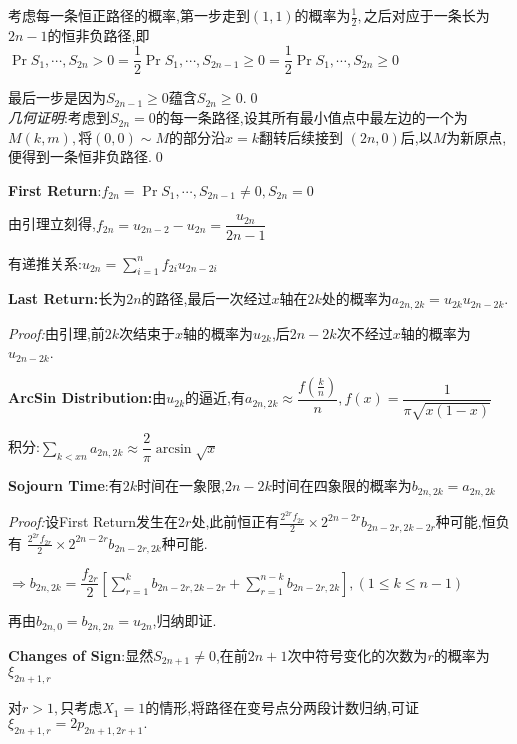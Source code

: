 考虑每一条恒正路径的概率,第一步走到$ (1,1)$的概率为$ \frac{1}{2},$之后对应于一条长为$ 2n-1$的恒非负路径,即
$ \Pr{S_1,\cdots ,S_{2n}>0}=\dfrac{1}{2}\Pr{S_1,\cdots ,S_{2n-1}\ge 0} = \dfrac{1}{2}\Pr{S_1,\cdots ,S_{2n}\ge 0}$

最后一步是因为$ S_{2n-1}\ge 0$蕴含$ S_{2n}\ge 0. $\qed
\\

\textit{几何证明}:考虑到$ S_{2n}=0$的每一条路径,设其所有最小值点中最左边的一个为$ M(k,m),$将$ (0,0)\sim M$的部分沿$ x=k$翻转后续接到
$ (2n,0)$后,以$ M$为新原点,便得到一条恒非负路径.\qed
\vspace{0.6cm}

  \textbf{First Return}:$ f_{2n} = \Pr{S_1,\cdots ,S_{2n-1}\neq 0, S_{2n} = 0}$

  由引理立刻得,$ f_{2n} = u_{2n-2}-u_{2n} = \dfrac{u_{2n}}{2n-1}$

  有递推关系:$ u_{2n}=\sum_{i=1}^n{f_{2i}u_{2n-2i}}$
  \vspace{0.6cm}

  \textbf{Last Return:}长为$ 2n$的路径,最后一次经过$ x$轴在$ 2k$处的概率为$ a_{2n,2k} = u_{2k}u_{2n-2k}$.

  \textit{Proof:}由引理,前$ 2k$次结束于$ x$轴的概率为$ u_{2k}$,后$ 2n-2k$次不经过$ x$轴的概率为$ u_{2n-2k}$.

  \textbf{ArcSin Distribution:}由$ u_{2k}$的逼近,有$ a_{2n,2k}\approx \dfrac{f(\frac{k}{n})}{n},f(x)=\dfrac{1}{\pi\sqrt{x(1-x)}}$

  积分:$\sum_{k<xn}a_{2n,2k}\approx \dfrac{2}{\pi}\arcsin{\sqrt{x}}$
\vspace{0.6cm}

\textbf{Sojourn Time}:有$ 2k$时间在一象限,$ 2n-2k$时间在四象限的概率为$ b_{2n,2k} = a_{2n,2k}$

\textit{Proof:}设First Return发生在$ 2r$处,此前恒正有$ \frac{2^{2r}f_{2r}}{2} \times 2^{2n-2r}b_{2n-2r,2k-2r}$种可能,恒负有
$ \frac{2^{2r}f_{2r}}{2}\times 2^{2n-2r}b_{2n-2r,2k}$种可能.

$ \Rightarrow b_{2n,2k} = \dfrac{f_{2r}}{2}[\sum_{r=1}^k{b_{2n-2r,2k-2r}} + \sum_{r=1}^{n-k}{b_{2n-2r,2k}}],(1\le k \le n-1)$

再由$ b_{2n,0}=b_{2n,2n}=u_{2n}$,归纳即证.
\vspace{0.6cm}

\textbf{Changes of Sign}:显然$ S_{2n+1}\neq 0$,在前$ 2n+1$次中符号变化的次数为$ r$的概率为$ \xi_{2n+1,r} $

对$ r>1,$只考虑$ X_1=1$的情形,将路径在变号点分两段计数归纳,可证$ \xi_{2n+1,r}=2p_{2n+1,2r+1}.$

